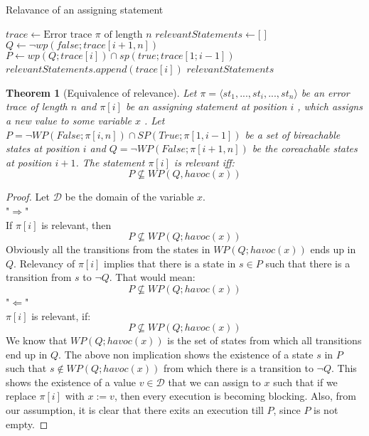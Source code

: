 \documentclass{article}
\newtheorem{theorem}{Theorem}
\begin{document}
\begin{algorithm}
\caption{Relavance of an assigning statement}\label{relevance}
\begin{algorithmic}[1]
\State $trace \gets \text{Error trace } \pi \text{ of length } \textit{n}$
\State $relevantStatements \gets \text{[ ]}$
\State $Q \gets \neg wp(false;trace[i+1,n])$
\State $P \gets wp(Q; trace[i]) \cap sp(true; trace[1;i-1])$
\State $relevantStatements.append(trace[i])$
\EndIf
\EndFor
\Return $relevantStatements$
\EndProcedure
\end{algorithmic}
\end{algorithm}
\begin{theorem}[Equivalence of relevance]\label{mydef:relevancytheorem}
Let $\pi = \langle st_1,...,st_i,...,st_n \rangle$ be an error trace of length $n$ and $\pi[i]$ be an assigning statement at position $i$ , which assigns a new value to some variable $x$ . Let $P = \neg WP(False; \pi[i,n]) \cap SP(True; \pi[1,i-1])$ be a set of bireachable states at position $i$ and $Q =  \neg WP(False; \pi[i+1,n])$ be the coreachable states at position $i+1$. The statement $\pi[i]$ is relevant iff:
 $$P \not \subseteq WP(Q,havoc(x))$$
\end{theorem}

\begin{proof}
Let $\mathcal{D}$ be the domain of the variable $x$. \\
"$\Rightarrow$"\\
If $\pi[i]$ is relevant, then\\
$$P \not \subseteq WP(Q;havoc(x))$$
Obviously all the transitions from the states in $WP(Q;havoc(x))$ ends up in $Q$. Relevancy of $\pi[i]$ implies that there is a state in $s \in P$ such that there is a transition from $s$ to $\neg Q$. That would mean:
$$P \not \subseteq WP(Q;havoc(x))$$
"$\Leftarrow$"\\
$\pi[i]$ is relevant, if:
$$P \not \subseteq WP(Q;havoc(x))$$
We know that $WP(Q;havoc(x))$ is the set of states from which all transitions end up in $Q$. The above non implication shows the existence of a state $s$ in $P$ such that $s \not \in WP(Q; havoc(x))$  from which there is a transition to $\neg Q$. This shows the existence of a value $v \in \mathcal{D}$ that we can assign to $x$ such that if we replace $\pi[i]$ with $x:=v$, then every execution is becoming blocking. Also, from our assumption, it is clear that there exits an execution till $P$, since $P$ is not empty.
\end{proof}
\end{document}
